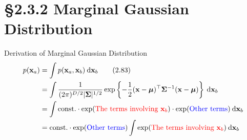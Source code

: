 \documentclass[10pt]{beamer}
\newcommand{\redtext}[1]{\textcolor{red}{#1}}
\newcommand{\bluetext}[1]{\textcolor{blue}{#1}}
\begin{document}
    \section{\S2.3.2 Marginal Gaussian Distribution}
    
    \begin{frame}{Derivation of Marginal Gaussian Distribution}
        \begin{align*}
            p(\mathbf x_a) &= \int p(\mathbf x_a, \mathbf x_b) \:\mathrm d\mathbf x_b \tag{2.83}\\
            &= \int \frac{1}{(2\pi)^{D/2}|\bm\Sigma|^{1/2}}\exp\left\{ -\frac{1}{2}(\mathbf x - \bm\mu)^\top \bm\Sigma^{-1}(\mathbf x - \bm\mu) \right\} \:\mathrm d\mathbf x_b \\
            &= \int \mathrm{const.} \cdot \exp(\redtext{\mbox{The terms involving $\mathbf x_b$}}) \cdot \exp(\bluetext{\mbox{Other terms}}) \:\mathrm d\mathbf x_b \\
            &= \mathrm{const.}\cdot \exp(\bluetext{\mbox{Other terms}}) \int \exp(\redtext{\mbox{The terms involving $\mathbf x_b$}}) \:\mathrm d\mathbf x_b
        \end{align*}
    \end{frame}
    
\end{document}
